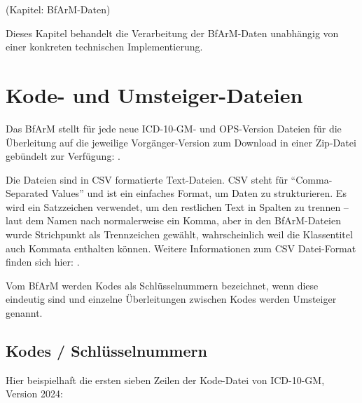 \newcommand{\codeBoxDouble}[3]{
\begin{tcolorbox}[center,width=#1\textwidth,
    colback=white,colframe=black,boxrule=.5pt]
\texttt{#2}
\tcblower
\texttt{#3}
\end{tcolorbox}
}




(Kapitel: BfArM-Daten)

Dieses Kapitel behandelt die Verarbeitung der BfArM-Daten unabhängig von einer konkreten technischen Implementierung. 

\section{Kode- und Umsteiger-Dateien}

Das BfArM stellt für jede neue ICD-10-GM- und OPS-Version Dateien für die Überleitung auf die jeweilige Vorgänger-Version zum Download in einer Zip-Datei gebündelt zur Verfügung: \citep[Downloads]{bfarmdl}.

Die Dateien sind in CSV formatierte Text-Dateien. CSV steht für ``Comma-Separated Values'' und ist ein einfaches Format, um Daten zu strukturieren. Es wird ein Satzzeichen verwendet, um den restlichen Text in Spalten zu trennen -- laut dem Namen nach normalerweise ein Komma, aber in den BfArM-Dateien wurde Strichpunkt als Trennzeichen gewählt, wahrscheinlich weil die Klassentitel auch Kommata enthalten können. Weitere Informationen zum CSV Datei-Format finden sich hier: \citep[Seite 131f]{bonnefoy2024definitive}. 

Vom BfArM werden Kodes als Schlüsselnummern bezeichnet, wenn diese eindeutig sind und einzelne Überleitungen zwischen Kodes werden Umsteiger genannt.

\subsection{Kodes / Schlüsselnummern}

Hier beispielhaft die ersten sieben Zeilen der Kode-Datei von ICD-10-GM, Version 2024:


